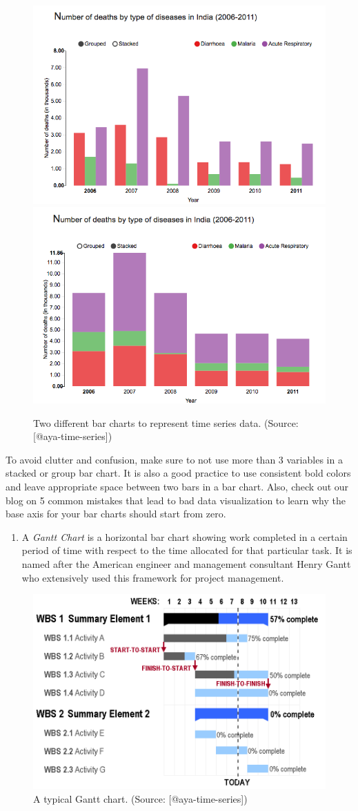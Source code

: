 \documentclass[]{book}
\providecommand{\tightlist}{%
  \setlength{\itemsep}{0pt}\setlength{\parskip}{0pt}}
\theoremstyle{definition}
\theoremstyle{definition}
\theoremstyle{definition}
\theoremstyle{remark}
\begin{document}
\begin{figure}

{\centering \includegraphics[width=0.4\linewidth]{images/aya-bar1} \includegraphics[width=0.4\linewidth]{images/aya-bar2} 

}

\caption{Two different bar charts to represent time series data. (Source: [@aya-time-series])}\label{fig:aya-bar}
\end{figure}

To avoid clutter and confusion, make sure to not use more than 3
variables in a stacked or group bar chart. It is also a good practice to
use consistent bold colors and leave appropriate space between two bars
in a bar chart. Also, check out our blog on 5 common mistakes that lead
to bad data visualization to learn why the base axis for your bar charts
should start from zero.

\begin{enumerate}
\def\labelenumi{\arabic{enumi}.}
\setcounter{enumi}{3}
\tightlist
\item
  A \emph{Gantt Chart} is a horizontal bar chart showing work completed
  in a certain period of time with respect to the time allocated for
  that particular task. It is named after the American engineer and
  management consultant Henry Gantt who extensively used this framework
  for project management.
\end{enumerate}

\begin{figure}

{\centering \includegraphics[width=0.5\linewidth]{images/aya-gantt} 

}

\caption{A typical Gantt chart. (Source: [@aya-time-series])}\label{fig:aya-gantt}
\end{figure}
\end{document}
